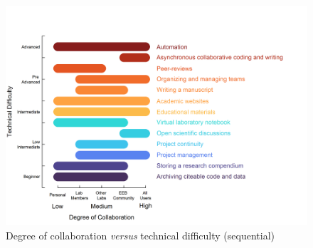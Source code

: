 \documentclass[
  11pt,
]{article}
\begin{document}
\begin{figure}
\centering
\includegraphics{../content/images/scatterblob_1-viridis-turbo.png}
\caption{Degree of collaboration \emph{versus} technical difficulty (sequential)}
\end{figure}
\end{document}
